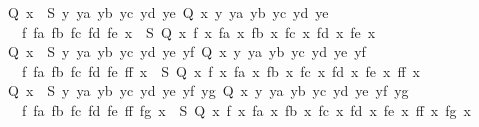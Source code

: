 \begin{isabellebody}
\ \ {\isachardoublequoteopen}{\isasymAnd}Q{\isachardot}{\kern0pt}\ {\isasymforall}x\ {\isasymin}\ S{\isachardot}{\kern0pt}\ {\isasymexists}y\ ya\ yb\ yc\ yd\ ye{\isachardot}{\kern0pt}\ Q\ x\ y\ ya\ yb\ yc\ yd\ ye\ {\isasymLongrightarrow}\isanewline
\ \ \ \ {\isasymexists}f\ fa\ fb\ fc\ fd\ fe{\isachardot}{\kern0pt}\ {\isasymforall}x\ {\isasymin}\ S{\isachardot}{\kern0pt}\ Q\ x\ {\isacharparenleft}{\kern0pt}f\ x{\isacharparenright}{\kern0pt}\ {\isacharparenleft}{\kern0pt}fa\ x{\isacharparenright}{\kern0pt}\ {\isacharparenleft}{\kern0pt}fb\ x{\isacharparenright}{\kern0pt}\ {\isacharparenleft}{\kern0pt}fc\ x{\isacharparenright}{\kern0pt}\ {\isacharparenleft}{\kern0pt}fd\ x{\isacharparenright}{\kern0pt}\ {\isacharparenleft}{\kern0pt}fe\ x{\isacharparenright}{\kern0pt}{\isachardoublequoteclose}\isanewline
\ \ {\isachardoublequoteopen}{\isasymAnd}Q{\isachardot}{\kern0pt}\ {\isasymforall}x\ {\isasymin}\ S{\isachardot}{\kern0pt}\ {\isasymexists}y\ ya\ yb\ yc\ yd\ ye\ yf{\isachardot}{\kern0pt}\ Q\ x\ y\ ya\ yb\ yc\ yd\ ye\ yf\ {\isasymLongrightarrow}\isanewline
\ \ \ \ {\isasymexists}f\ fa\ fb\ fc\ fd\ fe\ ff{\isachardot}{\kern0pt}\ {\isasymforall}x\ {\isasymin}\ S{\isachardot}{\kern0pt}\ Q\ x\ {\isacharparenleft}{\kern0pt}f\ x{\isacharparenright}{\kern0pt}\ {\isacharparenleft}{\kern0pt}fa\ x{\isacharparenright}{\kern0pt}\ {\isacharparenleft}{\kern0pt}fb\ x{\isacharparenright}{\kern0pt}\ {\isacharparenleft}{\kern0pt}fc\ x{\isacharparenright}{\kern0pt}\ {\isacharparenleft}{\kern0pt}fd\ x{\isacharparenright}{\kern0pt}\ {\isacharparenleft}{\kern0pt}fe\ x{\isacharparenright}{\kern0pt}\ {\isacharparenleft}{\kern0pt}ff\ x{\isacharparenright}{\kern0pt}{\isachardoublequoteclose}\isanewline
\ \ {\isachardoublequoteopen}{\isasymAnd}Q{\isachardot}{\kern0pt}\ {\isasymforall}x\ {\isasymin}\ S{\isachardot}{\kern0pt}\ {\isasymexists}y\ ya\ yb\ yc\ yd\ ye\ yf\ yg{\isachardot}{\kern0pt}\ Q\ x\ y\ ya\ yb\ yc\ yd\ ye\ yf\ yg\ {\isasymLongrightarrow}\isanewline
\ \ \ \ {\isasymexists}f\ fa\ fb\ fc\ fd\ fe\ ff\ fg{\isachardot}{\kern0pt}\ {\isasymforall}x\ {\isasymin}\ S{\isachardot}{\kern0pt}\ Q\ x\ {\isacharparenleft}{\kern0pt}f\ x{\isacharparenright}{\kern0pt}\ {\isacharparenleft}{\kern0pt}fa\ x{\isacharparenright}{\kern0pt}\ {\isacharparenleft}{\kern0pt}fb\ x{\isacharparenright}{\kern0pt}\ {\isacharparenleft}{\kern0pt}fc\ x{\isacharparenright}{\kern0pt}\ {\isacharparenleft}{\kern0pt}fd\ x{\isacharparenright}{\kern0pt}\ {\isacharparenleft}{\kern0pt}fe\ x{\isacharparenright}{\kern0pt}\ {\isacharparenleft}{\kern0pt}ff\ x{\isacharparenright}{\kern0pt}\ {\isacharparenleft}{\kern0pt}fg\ x{\isacharparenright}{\kern0pt}{\isachardoublequoteclose}\isanewline

\end{isabellebody}
